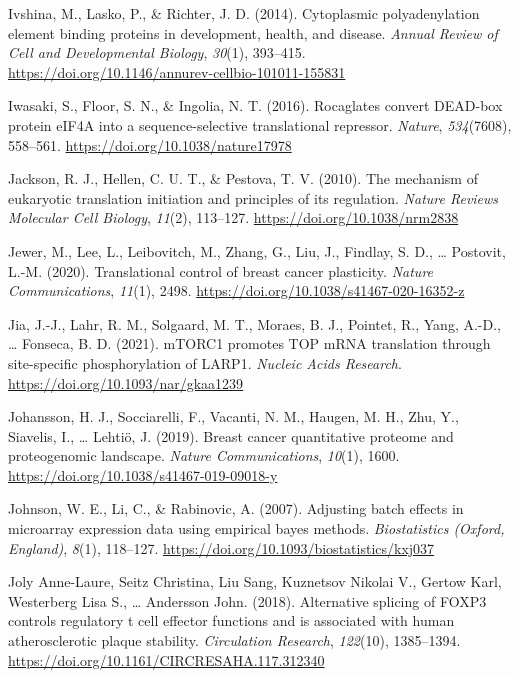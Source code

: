 \documentclass[12pt,openany]{book}
\begin{document}
\hypertarget{ref-Ivshina2014}{}
Ivshina, M., Lasko, P., \& Richter, J. D. (2014). Cytoplasmic
polyadenylation element binding proteins in development, health, and
disease. \emph{Annual Review of Cell and Developmental Biology},
\emph{30}(1), 393--415.
\url{https://doi.org/10.1146/annurev-cellbio-101011-155831}

\hypertarget{ref-Iwasaki2016}{}
Iwasaki, S., Floor, S. N., \& Ingolia, N. T. (2016). Rocaglates convert
DEAD-box protein eIF4A into a sequence-selective translational
repressor. \emph{Nature}, \emph{534}(7608), 558--561.
\url{https://doi.org/10.1038/nature17978}

\hypertarget{ref-Jackson2010}{}
Jackson, R. J., Hellen, C. U. T., \& Pestova, T. V. (2010). The
mechanism of eukaryotic translation initiation and principles of its
regulation. \emph{Nature Reviews Molecular Cell Biology}, \emph{11}(2),
113--127. \url{https://doi.org/10.1038/nrm2838}

\hypertarget{ref-Jewer2020}{}
Jewer, M., Lee, L., Leibovitch, M., Zhang, G., Liu, J., Findlay, S. D.,
\ldots{} Postovit, L.-M. (2020). Translational control of breast cancer
plasticity. \emph{Nature Communications}, \emph{11}(1), 2498.
\url{https://doi.org/10.1038/s41467-020-16352-z}

\hypertarget{ref-Jia2021}{}
Jia, J.-J., Lahr, R. M., Solgaard, M. T., Moraes, B. J., Pointet, R.,
Yang, A.-D., \ldots{} Fonseca, B. D. (2021). mTORC1 promotes TOP mRNA
translation through site-specific phosphorylation of LARP1.
\emph{Nucleic Acids Research}.
\url{https://doi.org/10.1093/nar/gkaa1239}

\hypertarget{ref-Johansson2019}{}
Johansson, H. J., Socciarelli, F., Vacanti, N. M., Haugen, M. H., Zhu,
Y., Siavelis, I., \ldots{} Lehtiö, J. (2019). Breast cancer quantitative
proteome and proteogenomic landscape. \emph{Nature Communications},
\emph{10}(1), 1600. \url{https://doi.org/10.1038/s41467-019-09018-y}

\hypertarget{ref-Johnson2007}{}
Johnson, W. E., Li, C., \& Rabinovic, A. (2007). Adjusting batch effects
in microarray expression data using empirical bayes methods.
\emph{Biostatistics (Oxford, England)}, \emph{8}(1), 118--127.
\url{https://doi.org/10.1093/biostatistics/kxj037}

\hypertarget{ref-JolyAnne-Laure2018}{}
Joly Anne-Laure, Seitz Christina, Liu Sang, Kuznetsov Nikolai V., Gertow
Karl, Westerberg Lisa S., \ldots{} Andersson John. (2018). Alternative
splicing of FOXP3 controls regulatory t cell effector functions and is
associated with human atherosclerotic plaque stability.
\emph{Circulation Research}, \emph{122}(10), 1385--1394.
\url{https://doi.org/10.1161/CIRCRESAHA.117.312340}
\end{document}

